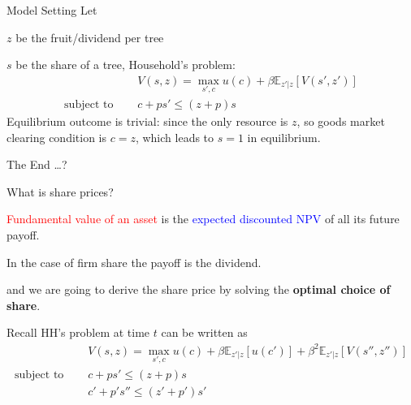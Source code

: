 \documentclass[aspectratio=169,xcolor=dvipsnames]{beamer}
\newcommand{\red}[1]{\textcolor{red}{#1}}
\newcommand{\blue}[1]{\textcolor{blue}{#1}}
\let\tempone\itemize
\let\temptwo\enditemize
\renewenvironment{itemize}{\tempone\addtolength{\itemsep}{\fill}}{\temptwo}
\begin{document}
\begin{frame}{Model Setting}
\label{slide:Model_Setting}
    Let
    \begin{itemize}
        \item $ z $ be the fruit/dividend per tree
        \item $ s $ be the share of a tree,
    \end{itemize}
    Household's problem:
    \begin{align}
            & V(s, z) = \max_{s', c} u(c) + \beta \mathbb{E}_{z'|z} [V(s', z')]
        \\
        \text{subject to } \quad
            & c + p s' \le (z+p)s
    \end{align}
    Equilibrium outcome is trivial: since the only resource is $ z $, so goods market clearing condition is $ c = z $, which leads to $ s = 1 $ in equilibrium.

    \pause

    \begin{center}
        \faSmileBeam[regular] The End \faSmileBeam[regular]\ldots?
    \end{center}
\end{frame}

\begin{frame}{What is share prices?}
\label{slide:What_is_share_prices_}

\begin{itemize}
    \item \red{Fundamental value of an asset} is the \blue{expected discounted NPV} of all its future payoff.
    \item In the case of firm share the payoff is the dividend.
    \item and we are going to derive the share price by solving the \textbf{optimal choice of share}.
\end{itemize}

Recall HH's problem at time $ t $ can be written as
%
\begin{align}
        & V(s, z) = \max_{s', c} u(c) + \beta \mathbb{E}_{z'|z}[ u(c') ] + \beta^{2} \mathbb{E}_{z'|z} [V(s'', z'')]
    \\
    \text{subject to } \quad
        & c + ps' \le (z+p)s
    \\
        & c' + p' s'' \le (z'+p')s'
\end{align}
%
\end{frame}
\end{document}
